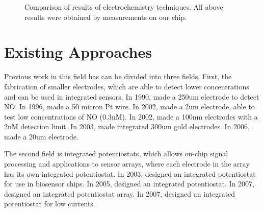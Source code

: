 \begin{figure}
	\centering
	\caption[Comparison of results of electrochemistry techniques]{Comparison of results of electrochemistry techniques. All above results were obtained by measurements on our chip.}
\end{figure}

\section{Existing Approaches}

Previous work in this field has can be divided into three fields. First, the fabrication of smaller electrodes, which are able to detect lower concentrations and can be used in integrated sensors. In 1990, \cite{shibuki1990emd} made a 250um electrode to detect NO. In 1996, \cite{bedioui1996cmm} made a 50 micron Pt wire. In 2002, \cite{zhang2002nmn} made a 2um electrode, able to test low concentrations of NO (0.3nM). In 2002, \cite{zhang2002nse} made a 100nm electrodes with a 2nM detection limit. In 2003, \cite{kim2003img} made integrated 300um gold electrodes. In 2006, \cite{wang2005mcn} made a 20um electrode.

The second field is integrated potentiostats, which allows on-chip signal processing and applications to sensor arrays, where each electrode in the array has its own integrated potentiostat. In 2003, \cite{frey2003dip} designed an integrated potentiostat for use in biosensor chips. In 2005, \cite{murari2005ipn} designed an integrated potentiostat. In 2007, \cite{stanacevic2007vpa} designed an integrated potentiostat array. In 2007, \cite{steffan2007scp} designed an integrated potentiostat for low currents.


